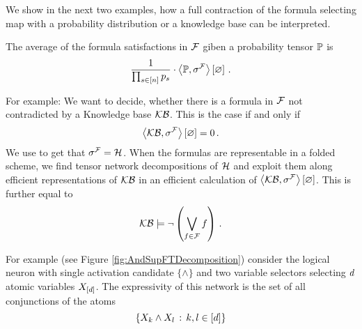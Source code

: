 
We show in the next two examples, how a full contraction of the formula selecting map with a probability distribution or a knowledge base can be interpreted.

\begin{example}
	The average of the formula satisfactions in $\mathcal{F}$ giben a probability tensor $\mathbb{P}$ is 
		\[ \frac{1}{\prod_{s\in[n]}p_{s}} \cdot \left\langle \mathbb{P},\sigma^{\mathcal{F}}\right\rangle \left[ \varnothing \right] \, . \]
\end{example}


\begin{example}
	For example: We want to decide, whether there is a formula in $\mathcal{F}$ not contradicted by a Knowledge base $\mathcal{KB}$.
	This is the case if and only if 
		\[ \left\langle \mathcal{KB},\sigma^{\mathcal{F}}\right\rangle \left[ \varnothing \right] = 0 \, .  \]
	We use  to get that $\sigma^{\mathcal{F}}=\mathcal{H}$.
	When the formulas are representable in a folded scheme, we find tensor network decompositions of $\mathcal{H}$ and exploit them along efficient representations of $\mathcal{KB}$ in an efficient calculation of $\left\langle \mathcal{KB},\sigma^{\mathcal{F}}\right\rangle \left[ \varnothing \right] $.
	This is further equal to 
		\[ \mathcal{KB} \models \lnot \left( \bigvee_{f\in\mathcal{F}} f\right) \, . \]
\end{example}



%










For example (see Figure \ref{fig:AndSupFTDecomposition}) consider the logical neuron with single activation candidate $\{\land\}$ and two variable selectors selecting $d$ atomic variables $X_{[d]}$.
The expressivity of this network is the set of all conjunctions of the atoms
	\[ \{X_{k} \land X_{l} \, : \, k,l\in[d] \} \]


